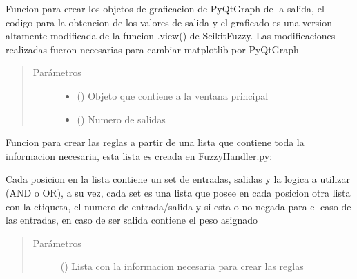 \documentclass[letterpaper,10pt,spanish]{sphinxmanual}
\begin{document}
\begin{fulllineitems}
\begin{fulllineitems}
\label{\detokenize{codigos/rutinas_fuzzy:rutinas_fuzzy.FuzzyController.crear_plots_out}}
Funcion para crear los objetos de graficacion de PyQtGraph de la salida, el codigo para la obtencion de los valores de salida y el graficado es una version altamente modificada de la funcion .view() de Scikit\sphinxhyphen{}Fuzzy. Las modificaciones realizadas fueron necesarias para cambiar matplotlib por PyQtGraph
\begin{quote}\begin{description}
\item[{Parámetros}] \leavevmode\begin{itemize}
\item {} 
 () \textendash{} Objeto que contiene a la ventana principal

\item {} 
 () \textendash{} Numero de salidas

\end{itemize}

\end{description}\end{quote}

\end{fulllineitems}


\begin{fulllineitems}
\label{\detokenize{codigos/rutinas_fuzzy:rutinas_fuzzy.FuzzyController.crear_reglas}}
Funcion para crear las reglas a partir de una lista que contiene toda la informacion necesaria, esta lista es creada en FuzzyHandler.py:

Cada posicion en la lista contiene un set de entradas, salidas y la logica a utilizar (AND o OR), a su vez, cada set es una lista que posee en cada posicion otra lista con la etiqueta, el numero de entrada/salida y si esta o no negada para el caso de las entradas, en caso de ser salida contiene el peso asignado
\begin{quote}\begin{description}
\item[{Parámetros}] \leavevmode
{} () \textendash{} Lista con la informacion necesaria para crear las reglas


\end{description}
\end{quote}
\end{fulllineitems}
\end{fulllineitems}
\end{document}
